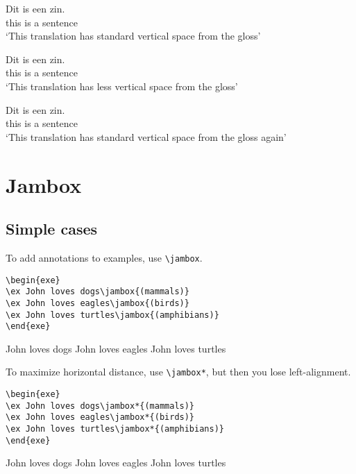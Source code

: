 \documentclass[output=paper]{langscibook}
\newcommand{\cmd}[1]{\texttt{\textbackslash#1}}
\begin{document}
\ea 
\gll Dit is een zin.\\ 
    this is a sentence\\
\glt `This translation has standard vertical space from the gloss'
\z

\nogltOffset

\ea 
\gll Dit is een zin.\\ 
    this is a sentence\\
\glt `This translation has less vertical space from the gloss'
\z

\resetgltOffset

\ea 
\gll Dit is een zin.\\ 
    this is a sentence\\
\glt `This translation has standard vertical space from the gloss again'
\z 




\section{Jambox}
\subsection{Simple cases}
To add annotations to examples, use \cmd{jambox}.


\begin{lstlisting}
\begin{exe}
\ex John loves dogs\jambox{(mammals)}
\ex John loves eagles\jambox{(birds)}
\ex John loves turtles\jambox{(amphibians)}   
\end{exe}
 \end{lstlisting}
 
\begin{exe}
\ex John loves dogs
\ex John loves eagles
\ex John loves turtles   
\end{exe}  



To maximize horizontal distance, use \cmd{jambox*}, but then you lose left-alignment.

\begin{lstlisting} 
\begin{exe}
\ex John loves dogs\jambox*{(mammals)}
\ex John loves eagles\jambox*{(birds)}
\ex John loves turtles\jambox*{(amphibians)}   
\end{exe}
 \end{lstlisting}
 
\begin{exe}
\settowidth{}
\ex John loves dogs
\ex John loves eagles
\ex John loves turtles   
\end{exe}  
\end{document}
